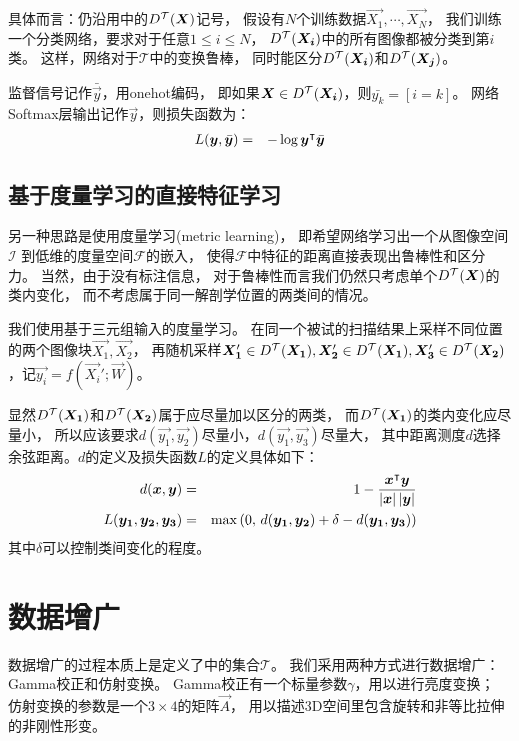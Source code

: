 具体而言：仍沿用中的$D^{\mathcal{T}}(\boldsymbol{X})$记号，
假设有$N$个训练数据$\vec{X_1},\cdots,\vec{X_N}$，
我们训练一个分类网络，要求对于任意$1\le i \le N$，
$D^{\mathcal{T}}(\boldsymbol{X_i})$中的所有图像都被分类到第$i$类。
这样，网络对于$\mathcal{T}$中的变换鲁棒，
同时能区分$D^{\mathcal{T}}(\boldsymbol{X_i})$和$D^{\mathcal{T}}(\boldsymbol{X_j})$。

监督信号记作$\bar{\vec{y}}$，用onehot编码，
即如果$\boldsymbol{X}\in D^{\mathcal{T}}(\boldsymbol{X_i})$，则$\bar{y_k}=[i=k]$。
网络Softmax层输出记作$\vec{y}$，则损失函数为：
\begin{eqnarray}
    L(\boldsymbol{y}, \bar{\boldsymbol{y}}) &=& -\log \boldsymbol{y}^\intercal\bar{\boldsymbol{y}}
\end{eqnarray}

\subsection{基于度量学习的直接特征学习\label{sec:cnn:loss:mtrc}}
另一种思路是使用度量学习(metric learning)，
即希望网络学习出一个从图像空间$\mathcal{I}$
到低维的度量空间$\mathcal{F}$的嵌入，
使得$\mathcal{F}$中特征的距离直接表现出鲁棒性和区分力。
当然，由于没有标注信息，
对于鲁棒性而言我们仍然只考虑单个$D^{\mathcal{T}}(\boldsymbol{X})$的类内变化，
而不考虑属于同一解剖学位置的两类间的情况。

我们使用基于三元组输入的度量学习。
在同一个被试的扫描结果上采样不同位置的两个图像块$\vec{X_1}, \vec{X_2}$，
再随机采样$\boldsymbol{X_1}' \in D^{\mathcal{T}}(\boldsymbol{X_1}), \boldsymbol{X_2}' \in D^{\mathcal{T}}(\boldsymbol{X_1}),
\boldsymbol{X_3}' \in D^{\mathcal{T}}(\boldsymbol{X_2})$，记$\vec{y_i}=f(\vec{X_i}';\vec{W})$。

显然$D^{\mathcal{T}}(\boldsymbol{X_1})$和$D^{\mathcal{T}}(\boldsymbol{X_2})$属于应尽量加以区分的两类，
而$D^{\mathcal{T}}(\boldsymbol{X_1})$的类内变化应尽量小，
所以应该要求$d(\vec{y_1},\vec{y_2})$尽量小，$d(\vec{y_1}, \vec{y_3})$尽量大，
其中距离测度$d$选择余弦距离。$d$的定义及损失函数$L$的定义具体如下：
\begin{eqnarray}
    d(\boldsymbol{x}, \boldsymbol{y}) &=& 1 -
        \frac{\boldsymbol{x}^\intercal\boldsymbol{y}}{\left|\boldsymbol{x}\right|\left|\boldsymbol{y}\right|} \nonumber \\
    L(\boldsymbol{y_1}, \boldsymbol{y_2}, \boldsymbol{y_3}) &=&
        \max\left(0,\,
            d(\boldsymbol{y_1}, \boldsymbol{y_2}) + \delta - d(\boldsymbol{y_1}, \boldsymbol{y_3})
        \right)
    \label{eqn:cnn:mtrc:loss}
\end{eqnarray}
其中$\delta$可以控制类间变化的程度。

\section{数据增广\label{sec:cnn:aug}}
数据增广的过程本质上是定义了中的集合$\mathcal{T}$。
我们采用两种方式进行数据增广：Gamma校正和仿射变换。
Gamma校正有一个标量参数$\gamma$，用以进行亮度变换；
仿射变换的参数是一个$3\times 4$的矩阵$\vec{A}$，
用以描述3D空间里包含旋转和非等比拉伸的非刚性形变。

